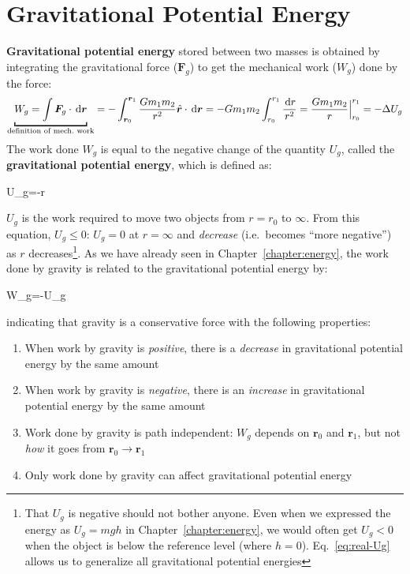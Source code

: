 \section{Gravitational Potential Energy}

\textbf{Gravitational potential energy} stored between two masses is obtained
by integrating the gravitational force ($\bm F_g$) to get the mechanical work
($W_g$) done by the force:
\begin{equation*}
  \underbracket[1pt]{
    W_g =\int \bm F_g\cdot\dl{\bm r}
  }_\text{definition of mech.\ work}
  =-\int_{\bm r_0}^{\bm r_1}\frac{Gm_1m_2}{r^2}\hat{\bm r}\cdot\dl{\bm r}
  =-Gm_1m_2\int_{r_0}^{r_1}\frac{\dl r}{r^2}=\frac{Gm_1m_2} r\Big|^{r_1}_{r_0}
  =-\Delta U_g
\end{equation*}
The work done $W_g$ is equal to the negative change of the quantity $U_g$,
called the \textbf{gravitational potential energy}, which is defined as:
\begin{important-equation} 
  U_g=-r
  \label{eq:real-Ug}
\end{important-equation}
$U_g$ is the work required to move two objects from $r=r_0$ to $\infty$. From
this equation, $U_g\leq 0$: $U_g=0$ at $r=\infty$ and \emph{decrease} (i.e.\
becomes ``more negative'') as $r$ decreases\footnote{That $U_g$ is negative
should not bother anyone. Even when we expressed the energy as $U_g=mgh$ in
Chapter~\ref{chapter:energy}, we would often get $U_g<0$ when the object is
below the reference level (where $h=0$). Eq.~\ref{eq:real-Ug} allows us to
generalize all gravitational potential energies}. As we have already seen in
Chapter~\ref{chapter:energy}, the work done by gravity is related to the
gravitational potential energy by:
\begin{important-equation}
  W_g=-\Delta U_g
\end{important-equation}
indicating that gravity is a conservative force with the following properties:

\begin{definition}
  \begin{enumerate}
  \item When work by gravity is \emph{positive}, there is a \emph{decrease}
    in gravitational potential energy by the same amount
  \item When work by gravity is \emph{negative}, there is an \emph{increase}
    in gravitational potential energy by the same amount
  \item Work done by gravity is path independent: $W_g$ depends on $\bm r_0$ and
    $\bm r_1$, but not \emph{how} it goes from $\bm r_0\to\bm r_1$
  \item Only work done by gravity can affect gravitational potential energy
  \end{enumerate}
\end{definition}

